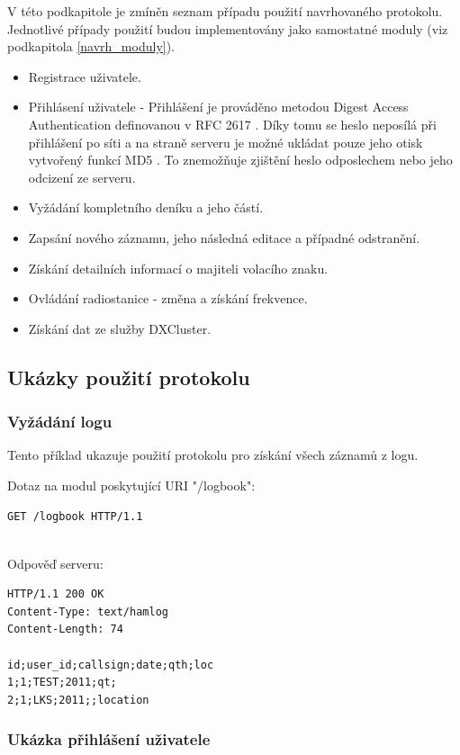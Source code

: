 V této podkapitole je zmíněn seznam případu použití navrhovaného protokolu. Jednotlivé případy použití
budou implementovány jako samostatné moduly (viz podkapitola \ref{navrh_moduly}).

\begin{itemize}
\item Registrace uživatele.
\item Přihlásení uživatele - Přihlášení je prováděno metodou Digest Access Authentication definovanou v
RFC 2617 \cite{rfc2617}. Díky tomu se heslo neposílá při přihlášení po síti a na straně serveru je možné ukládat
pouze jeho otisk vytvořený funkcí MD5 \cite{md5}. To znemožňuje zjištění heslo odposlechem nebo jeho odcizení ze
serveru.
\item Vyžádání kompletního deníku a jeho částí.
\item Zapsání nového záznamu, jeho následná editace a případné odstranění.
\item Získání detailních informací o majiteli volacího znaku.
\item Ovládání radiostanice - změna a získání frekvence.
\item Získání dat ze služby DXCluster.
\end{itemize}

\subsection{Ukázky použití protokolu}

\subsubsection{Vyžádání logu}

Tento příklad ukazuje použití protokolu pro získání všech záznamů z logu.

Dotaz na modul poskytující URI "/logbook":
\begin{verbatim}
GET /logbook HTTP/1.1


\end{verbatim}
Odpověď serveru:
\begin{verbatim}
HTTP/1.1 200 OK
Content-Type: text/hamlog
Content-Length: 74

id;user_id;callsign;date;qth;loc
1;1;TEST;2011;qt;
2;1;LKS;2011;;location
\end{verbatim}

\subsubsection{Ukázka přihlášení uživatele}

